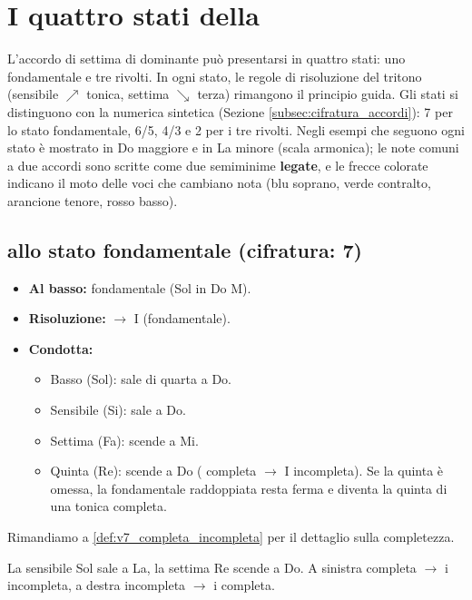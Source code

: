 \section{I quattro stati della }
\label{sec:stati_v7}

L'accordo di settima di dominante può presentarsi in quattro stati: uno fondamentale e tre rivolti. In ogni stato, le regole di risoluzione del tritono (sensibile $\nearrow$ tonica, settima $\searrow$ terza) rimangono il principio guida. Gli stati si distinguono con la numerica sintetica (Sezione \ref{subsec:cifratura_accordi}): 7 per lo stato fondamentale, 6/5, 4/3 e 2 per i tre rivolti. Negli esempi che seguono ogni stato è mostrato in Do maggiore e in La minore (scala armonica); le note comuni a due accordi sono scritte come due semiminime \textbf{legate}, e le frecce colorate indicano il moto delle voci che cambiano nota (blu soprano, verde contralto, arancione tenore, rosso basso).

\subsection{ allo stato fondamentale (cifratura: 7)}
\begin{itemize}
    \item \textbf{Al basso:} fondamentale (Sol in Do M).
    \item \textbf{Risoluzione:} $\rightarrow$ I (fondamentale).
    \item \textbf{Condotta:}
    \begin{itemize}
        \item Basso (Sol): sale di quarta a Do.
        \item Sensibile (Si): sale a Do.
        \item Settima (Fa): scende a Mi.
        \item Quinta (Re): scende a Do ( completa $\rightarrow$ I incompleta). Se la quinta è omessa, la fondamentale raddoppiata resta ferma e diventa la quinta di una tonica completa.
    \end{itemize}
\end{itemize}
Rimandiamo a \ref{def:v7_completa_incompleta} per il dettaglio sulla completezza.

\begin{esempio}
	\label{ex:v7_fond_minore}
	La sensibile Sol\diesis{} sale a La, la settima Re scende a Do. A sinistra  completa $\rightarrow$ i incompleta, a destra  incompleta $\rightarrow$ i completa.
\end{esempio}

